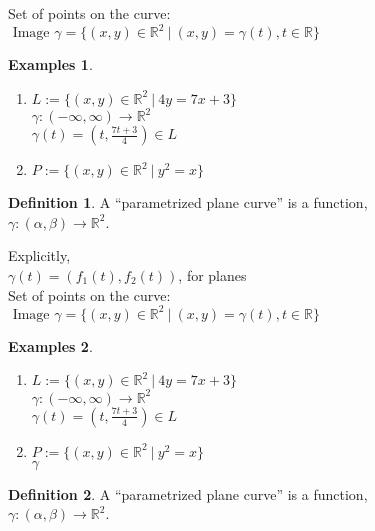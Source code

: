 \documentclass[twocolumn,20pt,fleqn]{extarticle}
\theoremstyle{plain}
\theoremstyle{definition}
\newtheorem*{definition}{Definition}
\newtheorem*{exmpls}{Examples}
\theoremstyle{remark}
\newenvironment*{examples}{\begin{exmpls} ~ \begin{enumerate}}{\end{enumerate}\end{exmpls}}
\begin{document}
Set of points on the curve:\\  $\textrm{ Image } \gamma = \{(x,y) \in \mathbb{R}^2 \ |\ (x,y) = \gamma(t), t \in \mathbb{R}\}$




\begin{examples}
  \item $L:=\{(x,y) \in \mathbb{R}^2\ |\ 4y = 7x + 3\}$\\
  $\gamma  : (-\infty,\infty) \to \mathbb{R}^2$ \\
  $\gamma(t) = (t, \frac{7t+3}{4})  \in L$\\
  \item $P:=\{(x,y) \in \mathbb{R}^2\ |\ y^2 = x\}$\\
  \end{examples}


\clearpage




\begin{definition}
  A  ``parametrized plane curve''  is a  function,\\ $\gamma  : (\alpha, \beta) \to \mathbb{R}^2$.
\end{definition}

Explicitly,\\
$\gamma(t) = (f_1(t), f_2(t))$, for planes\\

Set of points on the curve:\\  $\textrm{ Image } \gamma = \{(x,y) \in \mathbb{R}^2 \ |\ (x,y) = \gamma(t), t \in \mathbb{R}\}$




\begin{examples}
  \item $L:=\{(x,y) \in \mathbb{R}^2\ |\ 4y = 7x + 3\}$\\
  $\gamma  : (-\infty,\infty) \to \mathbb{R}^2$ \\
  $\gamma(t) = (t, \frac{7t+3}{4})  \in L$\\
  \item $P:=\{(x,y) \in \mathbb{R}^2\ |\ y^2 = x\}$\\
  $\gamma $\end{examples}


\clearpage




\begin{definition}
  A  ``parametrized plane curve''  is a  function,\\ $\gamma  : (\alpha, \beta) \to \mathbb{R}^2$.
\end{definition}
\end{document}
